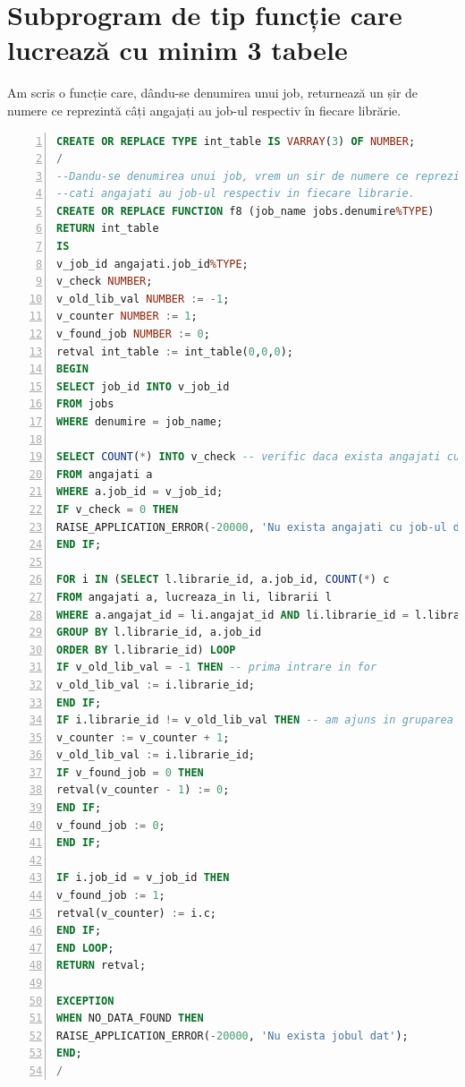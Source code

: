 \documentclass[12pt]{article}
\begin{document}
\section{Subprogram de tip funcție care lucrează cu minim 3 tabele}
Am scris o funcție care, dându-se denumirea unui job, returnează un șir de numere ce reprezintă câți angajați au job-ul respectiv în fiecare librărie.\\
\begin{lstlisting}[language=SQL,
	showspaces=false,
	basicstyle=\ttfamily,
	numbers=left,
	numberstyle=\tiny,
	breaklines=true,
	commentstyle=\color{gray}]
CREATE OR REPLACE TYPE int_table IS VARRAY(3) OF NUMBER;
/
--Dandu-se denumirea unui job, vrem un sir de numere ce reprezinta
--cati angajati au job-ul respectiv in fiecare librarie.
CREATE OR REPLACE FUNCTION f8 (job_name jobs.denumire%TYPE)
RETURN int_table
IS
v_job_id angajati.job_id%TYPE;
v_check NUMBER;
v_old_lib_val NUMBER := -1;
v_counter NUMBER := 1;
v_found_job NUMBER := 0;
retval int_table := int_table(0,0,0);
BEGIN
SELECT job_id INTO v_job_id
FROM jobs
WHERE denumire = job_name;

SELECT COUNT(*) INTO v_check -- verific daca exista angajati cu job-ul dat
FROM angajati a
WHERE a.job_id = v_job_id;
IF v_check = 0 THEN
RAISE_APPLICATION_ERROR(-20000, 'Nu exista angajati cu job-ul dat.');
END IF;

FOR i IN (SELECT l.librarie_id, a.job_id, COUNT(*) c
FROM angajati a, lucreaza_in li, librarii l
WHERE a.angajat_id = li.angajat_id AND li.librarie_id = l.librarie_id
GROUP BY l.librarie_id, a.job_id
ORDER BY l.librarie_id) LOOP
IF v_old_lib_val = -1 THEN -- prima intrare in for
v_old_lib_val := i.librarie_id;
END IF;
IF i.librarie_id != v_old_lib_val THEN -- am ajuns in gruparea pentru urmatoarea librarie
v_counter := v_counter + 1;
v_old_lib_val := i.librarie_id;
IF v_found_job = 0 THEN
retval(v_counter - 1) := 0;
END IF;
v_found_job := 0;
END IF;

IF i.job_id = v_job_id THEN
v_found_job := 1;
retval(v_counter) := i.c;
END IF;
END LOOP;    
RETURN retval;

EXCEPTION
WHEN NO_DATA_FOUND THEN
RAISE_APPLICATION_ERROR(-20000, 'Nu exista jobul dat');
END;
/
\end{lstlisting}
\end{document}
